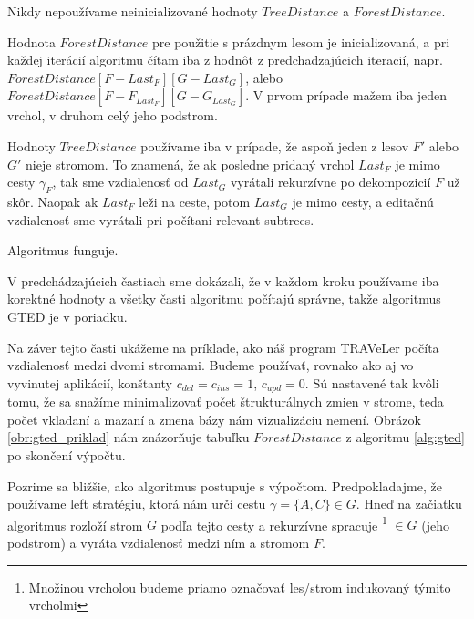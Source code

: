 \begin{lemma}
  Nikdy nepoužívame neinicializované hodnoty $TreeDistance$ a $ForestDistance$.
\end{lemma}

\begin{dukaz}
  Hodnota $ForestDistance$ pre použitie s prázdnym lesom je inicializovaná, a pri každej iterácií
  algoritmu čítam iba z hodnôt z predchadzajúcich iteracií, napr.
  $ForestDistance[F - Last_{F}][G - Last_{G}]$, alebo $ForestDistance[F - F_{Last_{F}}][G - G_{Last_{G}}]$.
  V prvom prípade mažem iba jeden vrchol, v druhom celý jeho podstrom.

  Hodnoty $TreeDistance$ používame iba v prípade, že aspoň jeden z lesov $F'$ alebo $G'$ nieje stromom.
  To znamená, že ak posledne pridaný vrchol $Last_{F}$ je mimo cesty $\gamma_{F}$, tak sme vzdialenosť
  od $Last_{G}$ vyrátali rekurzívne po dekompozicií $F$ už skôr.
  Naopak ak $Last_{F}$ leži na ceste, potom $Last_{G}$ je mimo cesty, a editačnú vzdialenosť
  sme vyrátali pri počítani relevant-subtrees.
\end{dukaz}

\begin{dusl}
  Algoritmus funguje.
\end{dusl}

\begin{dukaz}
  V predchádzajúcich častiach sme dokázali, že v každom kroku používame iba korektné hodnoty a
  všetky časti algoritmu počítajú správne, takže algoritmus GTED je v poriadku.
\end{dukaz}

Na záver tejto časti ukážeme na príklade, ako náš program TRAVeLer počíta vzdialenosť
medzi dvomi stromami. Budeme používať, rovnako ako aj vo vyvinutej aplikácií,
konštanty $c_{del} = c_{ins} = 1$, $c_{upd} = 0$. Sú nastavené tak
kvôli tomu, že sa snažíme minimalizovať počet štrukturálnych zmien v strome, teda
počet vkladaní a mazaní a zmena bázy nám vizualizáciu nemení.
Obrázok \ref{obr:gted_priklad} nám znázorňuje tabuľku $ForestDistance$ z algoritmu
\ref{alg:gted} po skončení výpočtu.

Pozrime sa bližšie, ako algoritmus postupuje s výpočtom. Predpokladajme, že
používame left stratégiu, ktorá nám určí cestu $\gamma = \{A, C\} \in G$.
Hneď na začiatku algoritmus rozloží strom $G$ podľa tejto cesty a rekurzívne
spracuje \footnote{Množinou vrcholou budeme priamo označovať les/strom
indukovaný týmito vrcholmi} $\in G$ (jeho podstrom) a vyráta vzdialenosť medzi ním a stromom $F$.

